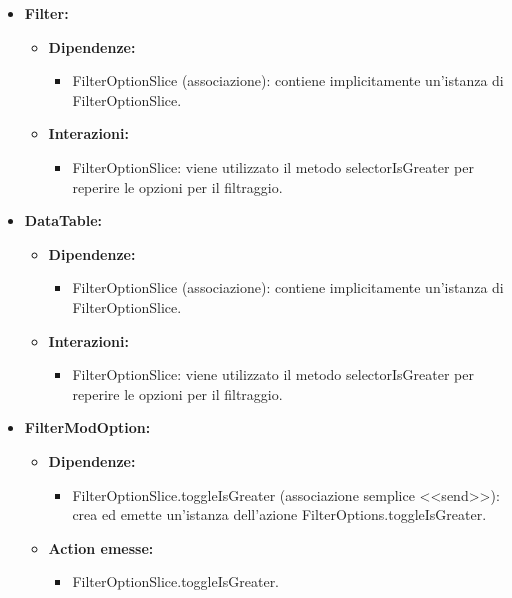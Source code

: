 \begin{itemize}
    \item \textbf{Filter:}
    \begin{itemize}
        \item \textbf{Dipendenze:}
        \begin{itemize}
            \item FilterOptionSlice (associazione): contiene implicitamente un'istanza di FilterOptionSlice.
        \end{itemize} 
        \item \textbf{Interazioni:}
        \begin{itemize}
            \item FilterOptionSlice: viene utilizzato il metodo selectorIsGreater per reperire le opzioni per il filtraggio.
        \end{itemize} 
    \end{itemize}

    \item \textbf{DataTable:}
    \begin{itemize}
        \item \textbf{Dipendenze:}
        \begin{itemize}
            \item FilterOptionSlice (associazione): contiene implicitamente un'istanza di FilterOptionSlice.
        \end{itemize} 
        \item \textbf{Interazioni:}
        \begin{itemize}
            \item FilterOptionSlice: viene utilizzato il metodo selectorIsGreater per reperire le opzioni per il filtraggio.
        \end{itemize} 
    \end{itemize}

    \item \textbf{FilterModOption:}
    \begin{itemize}
        \item \textbf{Dipendenze:}
        \begin{itemize}
            \item FilterOptionSlice.toggleIsGreater (associazione semplice <<send>>): crea ed emette un’istanza dell’azione FilterOptions.toggleIsGreater.
        \end{itemize}
        \item \textbf{Action emesse:}
        \begin{itemize}
            \item FilterOptionSlice.toggleIsGreater.
        \end{itemize}  
    \end{itemize}
\end{itemize}

